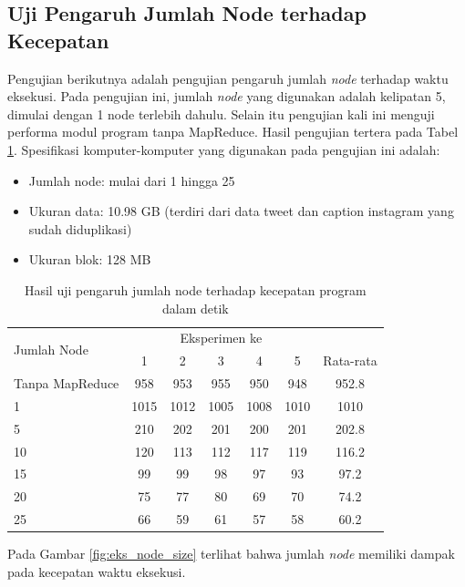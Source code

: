 \subsection{Uji Pengaruh Jumlah Node terhadap Kecepatan}
Pengujian berikutnya adalah pengujian pengaruh jumlah \textit{node} terhadap waktu eksekusi. Pada pengujian ini, jumlah \textit{node} yang digunakan adalah kelipatan 5, dimulai dengan 1 node terlebih dahulu. Selain itu pengujian kali ini menguji performa modul program tanpa MapReduce. Hasil pengujian tertera pada Tabel \ref{tab:waktu_node}. Spesifikasi komputer-komputer yang digunakan pada pengujian ini adalah:
\begin{itemize}
	\item Jumlah node: mulai dari 1 hingga 25 
	\item Ukuran data: 10.98 GB (terdiri dari data tweet dan caption instagram yang sudah diduplikasi)
	\item Ukuran blok: 128 MB
\end{itemize}

\begin{table}
	\centering
	\begin{tabular}{ | l | c | c | c | c | c | c |}
		\hline
		\multirow{2}{*}{Jumlah Node} 
		&\multicolumn{5}{c|}{Eksperimen ke }&\\
		\cline{2-6}
			& 1 & 2 & 3 & 4 & 5 & Rata-rata  \\
		\hline
		Tanpa MapReduce & 958	& 953	& 955	& 950	& 948  & 952.8\\
		1	& 1015	& 1012	& 1005	& 1008	& 1010 & 1010\\
		5	& 210	& 202	& 201	& 200	& 201 & 202.8\\
		10	 & 120	& 113	& 112	& 117	& 119 & 116.2\\
		15	 & 99	 & 99 & 98	 & 97 	& 93  & 97.2\\
		20	 & 75	 & 77 & 80	 & 69	 & 70 & 74.2\\
		25	 & 66	 & 59	 & 61 & 57	 & 58 & 60.2\\
		\hline
	\end{tabular}	
	\caption{Hasil uji pengaruh jumlah node terhadap kecepatan program dalam detik}\label{tab:waktu_node}
\end{table}	

Pada Gambar \ref{fig:eks_node_size} terlihat bahwa jumlah \textit{node} memiliki dampak pada kecepatan waktu eksekusi.

